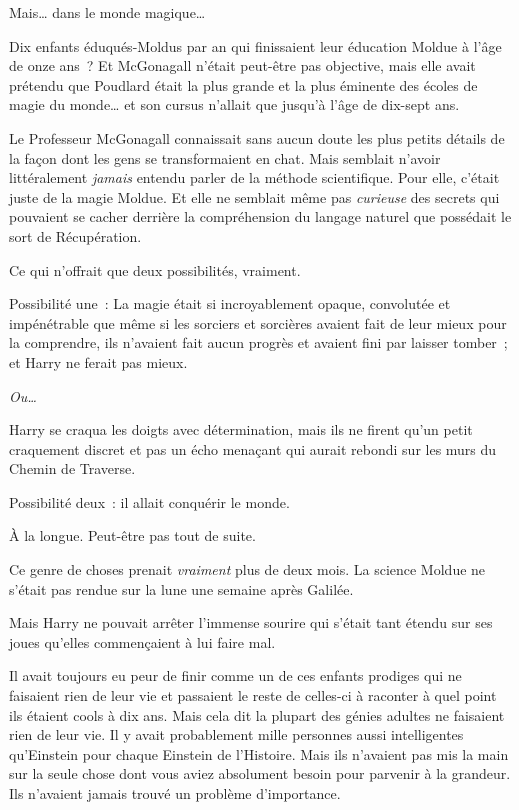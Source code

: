 Mais… dans le monde magique…

Dix enfants éduqués-Moldus par an qui finissaient leur éducation Moldue à l'âge de onze ans~? Et McGonagall n'était peut-être pas objective, mais elle avait prétendu que Poudlard était la plus grande et la plus éminente des écoles de magie du monde… et son cursus n'allait que jusqu'à l'âge de dix-sept ans.

Le Professeur McGonagall connaissait sans aucun doute les plus petits détails de la façon dont les gens se transformaient en chat. Mais semblait n'avoir littéralement \emph{jamais} entendu parler de la méthode scientifique. Pour elle, c'était juste de la magie Moldue. Et elle ne semblait même pas \emph{curieuse} des secrets qui pouvaient se cacher derrière la compréhension du langage naturel que possédait le sort de Récupération.

Ce qui n'offrait que deux possibilités, vraiment.

Possibilité une~: La magie était si incroyablement opaque, convolutée et impénétrable que même si les sorciers et sorcières avaient fait de leur mieux pour la comprendre, ils n'avaient fait aucun progrès et avaient fini par laisser tomber~; et Harry ne ferait pas mieux.

\emph{Ou…}

Harry se craqua les doigts avec détermination, mais ils ne firent qu'un petit craquement discret et pas un écho menaçant qui aurait rebondi sur les murs du Chemin de Traverse.

Possibilité deux~: il allait conquérir le monde.

À la longue. Peut-être pas tout de suite.

Ce genre de choses prenait \emph{vraiment} plus de deux mois. La science Moldue ne s'était pas rendue sur la lune une semaine après Galilée.

Mais Harry ne pouvait arrêter l'immense sourire qui s'était tant étendu sur ses joues qu'elles commençaient à lui faire mal.

Il avait toujours eu peur de finir comme un de ces enfants prodiges qui ne faisaient rien de leur vie et passaient le reste de celles-ci à raconter à quel point ils étaient cools à dix ans. Mais cela dit la plupart des génies adultes ne faisaient rien de leur vie. Il y avait probablement mille personnes aussi intelligentes qu'Einstein pour chaque Einstein de l'Histoire. Mais ils n'avaient pas mis la main sur la seule chose dont vous aviez absolument besoin pour parvenir à la grandeur. Ils n'avaient jamais trouvé un problème d'importance.

